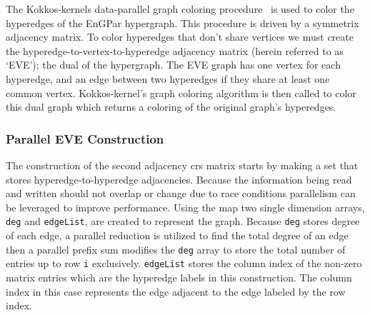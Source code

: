 \documentclass[graybox]{svmult}
\begin{document}
The Kokkos-kernels data-parallel graph coloring procedure~\cite{kokkosColoring} is used to
color the hyperedges of the EnGPar hypergraph.
This procedure is driven by a symmetrix adjacency matrix.
To color hyperedges that don't share vertices we must create the
hyperedge-to-vertex-to-hyperedge adjacency matrix (herein referred to as `EVE');
the dual of the hypergraph.
The EVE graph has one vertex for each hyperedge, and an edge between two
hyperedges if they share at least one common vertex.
Kokkos-kernel's graph coloring algorithm is then called to color this dual graph
which returns a coloring of the original graph's hyperedges.

\subsubsection{Parallel EVE Construction}

The construction of the second adjacency crs matrix starts by making a
set that stores hyperedge-to-hyperedge adjacencies. Because the information being read and written should not overlap or change due to race conditions parallelism can be leveraged to improve performance. Using the map two single dimension arrays, \verb|deg| and \verb|edgeList|, are created to represent the graph. Because \verb|deg| stores degree of each edge, a parallel reduction is utilized to find the total degree of an edge then a parallel prefix sum modifies the \verb|deg| array to store the total number of entries up to row \verb|i| exclusively. \verb|edgeList| stores the column index of the non-zero matrix entries which are the hyperedge labels in this construction. The column index in this case represents the edge adjacent to the edge labeled by the row index.
\end{document}
